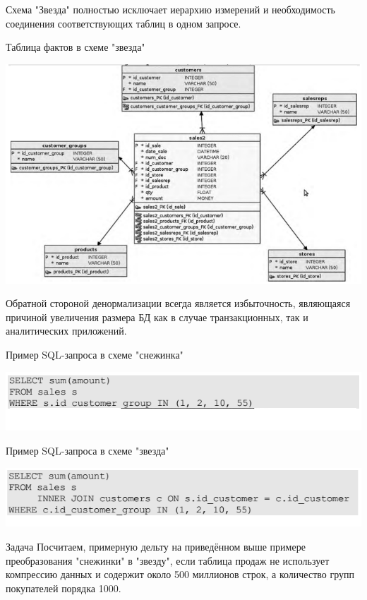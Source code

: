 \documentclass{beamer}
\begin{document}
\begin{frame}
Схема "Звезда" полностью исключает иерархию измерений и необходимость соединения соответствующих таблиц в одном запросе.
\begin{block}{Таблица фактов в схеме "звезда"}
\begin{center}
\includegraphics[scale=0.45]{images/star.png}
\end{center}
\end{block}
Обратной стороной денормализации всегда является избыточность, являющаяся причиной увеличения размера БД как в случае транзакционных, так и аналитических приложений.
\end{frame}


\begin{frame}
\begin{block}{Пример SQL-запроса в схеме "снежинка"}
\begin{center}
\includegraphics[scale=0.5]{images/star-sql.png}
\end{center}
\end{block}
\begin{block}{Пример SQL-запроса в схеме "звезда"}
\begin{center}
\includegraphics[scale=0.5]{images/snow-sql.png}
\end{center}
\end{block}
\begin{block}{Задача}
Посчитаем, примерную дельту на приведённом выше примере преобразования
"снежинки" в "звезду", если таблица продаж не использует компрессию данных и содержит
около 500 миллионов строк, а количество групп покупателей порядка 1000.
\end{block}
\end{frame}
\end{document}
